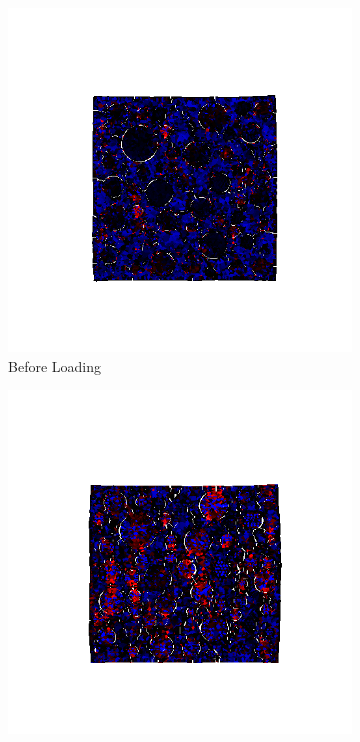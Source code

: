 \begin{figure}[ht]
\centering

    \begin{subfigure}{.33\textwidth}
      \centering
      \includegraphics[width=1.0\linewidth]{Files/A30P75_3_IS_Free/DEP50-STEP(020).png}
      \caption{Before Loading}
    \end{subfigure}%
    \begin{subfigure}{.33\textwidth}
      \centering
      \includegraphics[width=1.0\linewidth]{Files/A30P75_3_IS_Free/DEP50-STEP(040).png}

\end{subfigure}
\end{figure}
